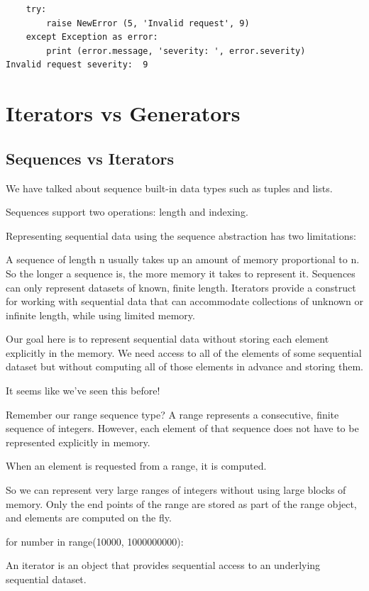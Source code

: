\documentclass{article}
\begin{document}
\begin{lstlisting}
    try:
        raise NewError (5, 'Invalid request', 9)
    except Exception as error:
        print (error.message, 'severity: ', error.severity)
Invalid request severity:  9
\end{lstlisting}


\section{Iterators vs Generators}
\subsection{Sequences vs Iterators}
We have talked about sequence built-in data types such as tuples and lists.

Sequences support two operations: length and indexing.

Representing sequential data using the sequence abstraction has two limitations: 

A sequence of length n usually takes up an amount of memory proportional to n. So the longer a sequence is, the more memory it takes to represent it.
Sequences can only represent datasets of known, finite length.
Iterators provide a construct for working with sequential data that can accommodate collections of unknown or infinite length, while using limited memory.

Our goal here is to represent sequential data without storing each element explicitly in the memory.  We need access to all of the elements of some sequential dataset but without computing all of those elements in advance and storing them.

It seems like we’ve seen this before!

Remember our range sequence type? A range represents a consecutive, finite sequence of integers.  However, each element of that sequence does not have to be represented explicitly in memory. 

When an element is requested from a range, it is computed. 

So we can represent very large ranges of integers without using large blocks of memory. Only the end points of the range are stored as part of the range object, and elements are computed on the fly.

for number in range(10000, 1000000000):

An iterator is an object that provides sequential access to an underlying sequential dataset. 
\end{document}
